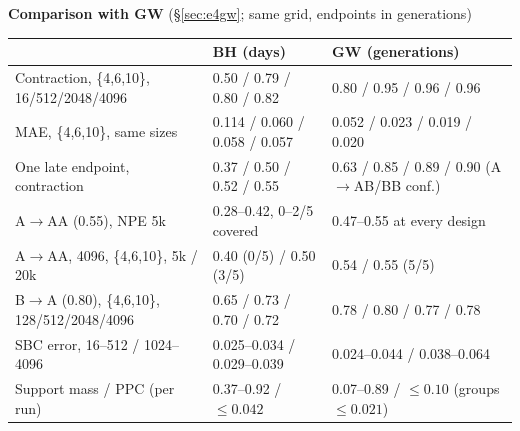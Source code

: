 \documentclass[10pt,a4paper]{article}
\newcommand{\blk}[1]{\par\needspace{5\baselineskip}\smallskip{\sffamily\bfseries\color{inkgray}#1}\par}
\newcommand{\Comment}{\blk{Comment}}
\renewcommand{\blk}[1]{\par\Needspace*{5\baselineskip}\smallskip{\sffamily\bfseries\color{inkgray}#1}\par}
\begin{document}
\begin{center}
\medskip\textbf{Comparison with GW} (\S\ref{sec:e4gw}; same grid, endpoints in generations)\\[2pt]
\begin{tabular}{@{}lll@{}}\toprule
 & \textbf{BH} (days) & \textbf{GW} (generations) \\\midrule
Contraction, \{4,6,10\}, 16/512/2048/4096 & 0.50 / 0.79 / 0.80 / 0.82 & 0.80 / 0.95 / 0.96 / 0.96 \\
MAE, \{4,6,10\}, same sizes & 0.114 / 0.060 / 0.058 / 0.057 & 0.052 / 0.023 / 0.019 / 0.020 \\
One late endpoint, contraction & 0.37 / 0.50 / 0.52 / 0.55 & 0.63 / 0.85 / 0.89 / 0.90 (A$\to$AB/BB conf.) \\
A$\to$AA (0.55), NPE 5k & 0.28--0.42, 0--2/5 covered & 0.47--0.55 at every design \\
A$\to$AA, 4096, \{4,6,10\}, 5k / 20k & 0.40 (0/5) / 0.50 (3/5) & 0.54 / 0.55 (5/5) \\
B$\to$A (0.80), \{4,6,10\}, 128/512/2048/4096 & 0.65 / 0.73 / 0.70 / 0.72 & 0.78 / 0.80 / 0.77 / 0.78 \\
SBC error, 16--512 / 1024--4096 & 0.025--0.034 / 0.029--0.039 & 0.024--0.044 / 0.038--0.064 \\
Support mass / PPC (per run) & 0.37--0.92 / $\le 0.042$ & 0.07--0.89 / $\le 0.10$ (groups $\le 0.021$) \\\bottomrule
\end{tabular}
\end{center}
\Comment
\end{document}
